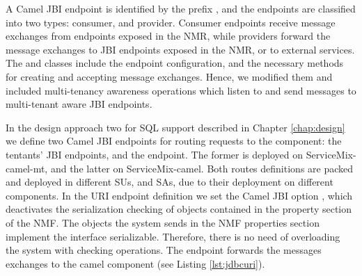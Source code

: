 A Camel \ac{JBI} endpoint is identified by the prefix , and the endpoints are classified into two types: consumer, and provider. Consumer endpoints receive message exchanges from endpoints exposed in the \ac{NMR}, while providers forward the message exchanges to \ac{JBI} endpoints exposed in the \ac{NMR}, or to external services. The  and  classes include the endpoint configuration, and the necessary methods for creating and accepting message exchanges. Hence, we modified them and included multi-tenancy awareness operations which listen to and send messages to multi-tenant aware \ac{JBI} endpoints. 

In the design approach two for \ac{SQL} support described in Chapter \ref{chap:design} we define two Camel \ac{JBI} endpoints for routing requests to the  component: the tentants' \ac{JBI} endpoints, and the  endpoint. The former is deployed on ServiceMix-camel-mt, and the latter on ServiceMix-camel. Both routes definitions are packed and deployed in different \ac{SU}s, and \ac{SA}s, due to their deployment on different components. In the \ac{URI} endpoint definition we set the Camel \ac{JBI} option , which deactivates the serialization checking of objects contained in the property section of the \ac{NMF}. The objects the system sends in the \ac{NMF} properties section implement the interface serializable. Therefore, there is no need of overloading the system with checking operations. The  endpoint forwards the messages exchanges to the  camel component (see Listing \ref{lst:jdbcuri}).

